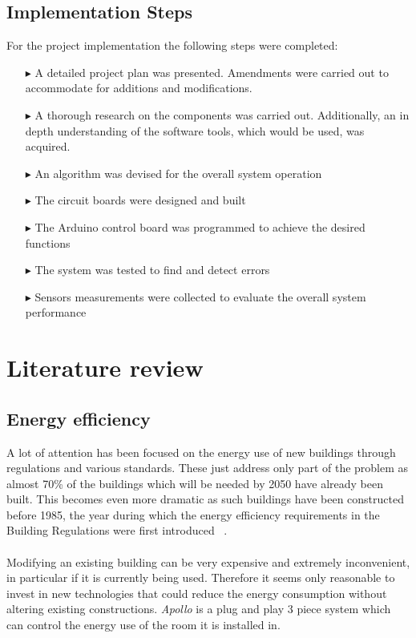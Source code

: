 \documentclass[12pt,a4paper,draft]{report}
\begin{document}
\section{Implementation Steps}
For the project implementation the following steps were completed:
\begin{itemize}
	\item[$\blacktriangleright$] A detailed project plan was presented. 
		Amendments were carried out to accommodate for additions and modifications.
	\item[$\blacktriangleright$] A thorough research on the components was carried out. 
		Additionally, an in depth understanding of the software tools, which would be used, was acquired.
	\item[$\blacktriangleright$] An algorithm was devised for the overall system operation
	\item[$\blacktriangleright$] The circuit boards were designed and built
	\item[$\blacktriangleright$] The Arduino control board was programmed to achieve the desired functions
	\item[$\blacktriangleright$] The system was tested to find and detect errors
	\item[$\blacktriangleright$] Sensors measurements were collected to evaluate the overall system performance
\end{itemize}
%
\newpage
\chapter{Literature review}
%
\section{Energy efficiency}
A lot of attention has been focused on the energy use of new buildings through regulations and various standards. These just address only part of the problem as almost 70\% of the buildings which will be needed by 2050 have already been built. This becomes even more dramatic as such buildings have been constructed before 1985, the year during which the energy efficiency requirements in the Building Regulations were first introduced ~\cite{website:building_reg,website:carbon_trust}.
\ \\
\ \\
Modifying an existing building can be very expensive and extremely inconvenient, in particular if it is currently being used. Therefore it seems only reasonable to invest in new technologies that could reduce the energy consumption without altering existing constructions. \emph{Apollo} is a plug and play 3 piece system which can control the energy use of the room it is installed in.\\
\ \\
%
\end{document}
